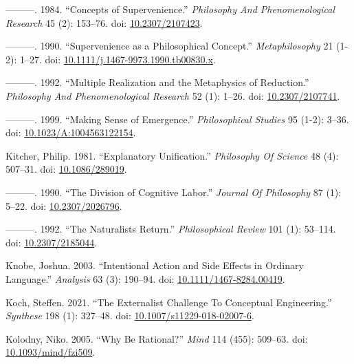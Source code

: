 \documentclass[
  10pt,
  letterpaper,
  DIV=11,
  numbers=noendperiod,
  twoside]{scrartcl}
\newlength{\cslhangindent}
\newenvironment{CSLReferences}[2] %
 {\begin{list}{}{%
  \setlength{\itemindent}{0pt}
  \setlength{\leftmargin}{0pt}
  \setlength{\parsep}{0pt}
  \ifodd #1
   \setlength{\leftmargin}{\cslhangindent}
   \setlength{\itemindent}{-1\cslhangindent}
  \fi
  \setlength{\itemsep}{#2\baselineskip}}}
 {\end{list}}
\begin{document}
\begin{CSLReferences}{1}{0}
---------. 1984. {``Concepts of Supervenience.''} \emph{Philosophy And
Phenomenological Research} 45 (2): 153--76. doi:
\href{https://doi.org/10.2307/2107423}{10.2307/2107423}.

---------. 1990. {``Supervenience as a Philosophical Concept.''}
\emph{Metaphilosophy} 21 (1-2): 1--27. doi:
\href{https://doi.org/10.1111/j.1467-9973.1990.tb00830.x}{10.1111/j.1467-9973.1990.tb00830.x}.

---------. 1992. {``Multiple Realization and the Metaphysics of
Reduction.''} \emph{Philosophy And Phenomenological Research} 52 (1):
1--26. doi: \href{https://doi.org/10.2307/2107741}{10.2307/2107741}.

---------. 1999. {``Making Sense of Emergence.''} \emph{Philosophical
Studies} 95 (1-2): 3--36. doi:
\href{https://doi.org/10.1023/A:1004563122154}{10.1023/A:1004563122154}.

Kitcher, Philip. 1981. {``Explanatory Unification.''} \emph{Philosophy
Of Science} 48 (4): 507--31. doi:
\href{https://doi.org/10.1086/289019}{10.1086/289019}.

---------. 1990. {``The Division of Cognitive Labor.''} \emph{Journal Of
Philosophy} 87 (1): 5--22. doi:
\href{https://doi.org/10.2307/2026796}{10.2307/2026796}.

---------. 1992. {``The Naturalists Return.''} \emph{Philosophical
Review} 101 (1): 53--114. doi:
\href{https://doi.org/10.2307/2185044}{10.2307/2185044}.

Knobe, Joshua. 2003. {``Intentional Action and Side Effects in Ordinary
Language.''} \emph{Analysis} 63 (3): 190--94. doi:
\href{https://doi.org/10.1111/1467-8284.00419}{10.1111/1467-8284.00419}.

Koch, Steffen. 2021. {``The Externalist Challenge To Conceptual
Engineering.''} \emph{Synthese} 198 (1): 327--48. doi:
\href{https://doi.org/10.1007/s11229-018-02007-6}{10.1007/s11229-018-02007-6}.

Kolodny, Niko. 2005. {``Why Be Rational?''} \emph{Mind} 114 (455):
509--63. doi:
\href{https://doi.org/10.1093/mind/fzi509}{10.1093/mind/fzi509}.


\end{CSLReferences}
\end{document}
